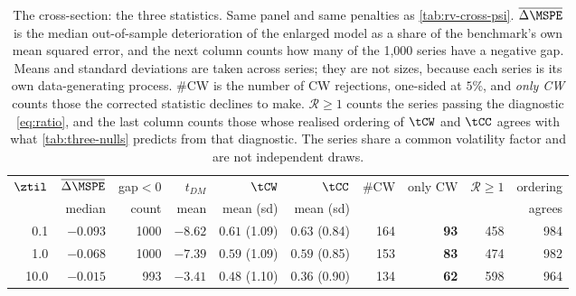 \begin{table}[htbp]
\centering
\caption{The cross-section: the three statistics. Same panel and same penalties as \cref{tab:rv-cross-psi}. $\overline{\Delta\MSPE}$ is the median out-of-sample deterioration of the enlarged model as a share of the benchmark's own mean squared error, and the next column counts how many of the 1{,}000 series have a negative gap. Means and standard deviations are taken across series; they are not sizes, because each series is its own data-generating process. $\#$CW is the number of CW rejections, one-sided at $5\%$, and \emph{only CW} counts those the corrected statistic declines to make. $\mathcal R\ge1$ counts the series passing the diagnostic \eqref{eq:ratio}, and the last column counts those whose realised ordering of $\tCW$ and $\tCC$ agrees with what \cref{tab:three-nulls} predicts from that diagnostic. The series share a common volatility factor and are not independent draws.}
\label{tab:rv-cross-stats}
\small
\setlength{\tabcolsep}{4pt}
\begin{tabular}{rrrrrrrrrr}
\toprule
$\ztil$ & $\overline{\Delta\MSPE}$ & gap$<0$ & $t_{DM}$ & $\tCW$ & $\tCC$ & \#CW & only CW & $\mathcal R\ge1$ & ordering \\
 & median & count & mean & mean (sd) & mean (sd) & & & & agrees \\
\midrule
0.1 & $-0.093$ & 1000 & $-8.62$ & $0.61$ (1.09) & $0.63$ (0.84) & 164 & \textbf{93} & 458 & 984 \\
1.0 & $-0.068$ & 1000 & $-7.39$ & $0.59$ (1.09) & $0.59$ (0.85) & 153 & \textbf{83} & 474 & 982 \\
10.0 & $-0.015$ & 993 & $-3.41$ & $0.48$ (1.10) & $0.36$ (0.90) & 134 & \textbf{62} & 598 & 964 \\
\bottomrule
\end{tabular}
\end{table}
